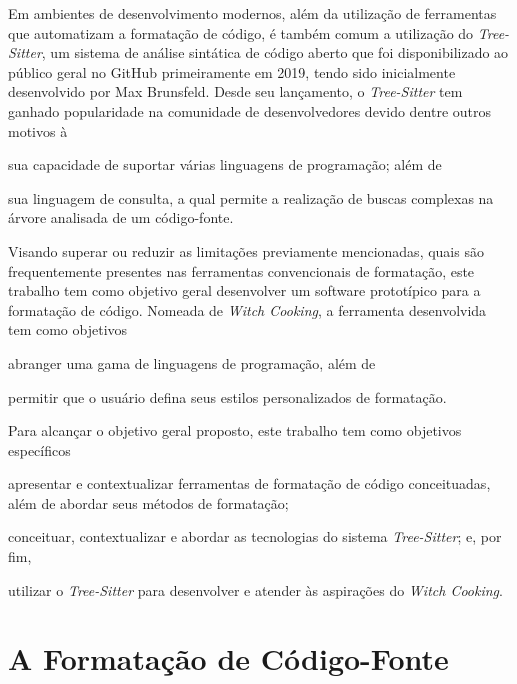 \documentclass
  [11pt,a4paper,english,brazil,openright,sumario=tradicional,twoside]
  {abntex2}
\newcommand{\treesitter}{\textit{Tree-Sitter}\xspace}
\newcommand{\witchcooking}{\textit{Witch Cooking}\xspace}
\begin{document}
  Em ambientes de desenvolvimento modernos, além da utilização de ferramentas
  que automatizam a formatação de código, é também comum a utilização do
  \treesitter \cite{tree-sitter-2018-tree}, um sistema de análise sintática de
  código aberto que foi disponibilizado ao público geral no GitHub
  primeiramente em 2019, tendo sido inicialmente desenvolvido por Max
  Brunsfeld. Desde seu lançamento, o \treesitter tem ganhado popularidade na
  comunidade de desenvolvedores devido dentre outros motivos à
  \begin{inparaenum}
    \item sua capacidade de suportar várias linguagens de programação; além de
    \item sua linguagem de consulta, a qual permite a realização de buscas
          complexas na árvore analisada de um código-fonte.
  \end{inparaenum}

  Visando superar ou reduzir as limitações previamente mencionadas, quais são
  frequentemente presentes nas ferramentas convencionais de formatação, este
  trabalho tem como objetivo geral desenvolver um software prototípico para a
  formatação de código. Nomeada de \witchcooking \cite{silva-2023-witch}, a
  ferramenta desenvolvida tem como objetivos
  \begin{inparaenum}
    \item abranger uma gama de linguagens de programação, além de
    \item permitir que o usuário defina seus estilos personalizados de
          formatação.
  \end{inparaenum}

  Para alcançar o objetivo geral proposto, este trabalho tem como objetivos
  específicos
  \begin{inparaenum}
    \item apresentar e contextualizar ferramentas de formatação de código
          conceituadas, além de abordar seus métodos de formatação;
    \item conceituar, contextualizar e abordar as tecnologias do sistema
          \treesitter; e, por fim,
    \item utilizar o \treesitter para desenvolver e atender às aspirações do
          \witchcooking.
  \end{inparaenum}


  \chapter{A Formatação de Código-Fonte}
\end{document}
